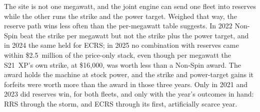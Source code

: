 The site is not one megawatt, and the joint engine can send one fleet into reserves while the other runs the strike and the power target. Weighed that way, the reserve path wins less often than the per-megawatt table suggests. In 2022 Non-Spin beat the strike per megawatt but not the strike plus the power target, and in 2024 the same held for ECRS; in 2025 no combination with reserves came within \$2.5~million of the price-only stack, even though per megawatt the S21~XP's own strike, at \$16,000, was worth less than a Non-Spin award. %
The award holds the machine at stock power, and the strike and power-target gains it forfeits were worth more than the award in those three years. %
Only in 2021 and 2023 did reserves win, for both fleets, and only with the year's outcomes in hand: RRS through the storm, and ECRS through its first, artificially scarce year.

